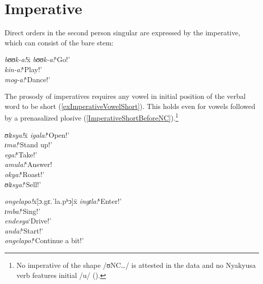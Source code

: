\section{Imperative}\label{Imperative}
Direct orders in the second person singular are expressed by the imperative, which can consist of the bare stem:
\begin{exe}
\ex
\begin{tabbing}
\textit{bʊʊk-a!}x\=\kill
\textit{bʊʊk-a!}\>`Go!'
\\\textit{kin-a!}\>`Play!'
\\\textit{mog-a!}\>`Dance!'
\end{tabbing}
\end{exe}
The prosody of imperatives requires any vowel in initial position of the verbal word to be short (\ref{exImperativeVowelShort}). This holds even for vowels followed by a prenasalized plosive (\ref{ImperativeShortBeforeNC}).\footnote{No imperative of the shape /ʊNC\ldots / is attested in the data and no Nyakyusa verb features initial /u/ ().}

\begin{exe}
\ex\label{exImperativeVowelShort}
\begin{tabbing}
\textit{ʊlɪsya!}x\=\kill
\textit{igala!}\>`Open!'
\\\textit{ɪma!}\>`Stand up!'
\\\textit{ega!}\>`Take!'
\\\textit{amula!}\>`Answer!
\\\textit{okya!}\>`Roast!'
\\\textit{ʊlɪsya!}\>`Sell!'
\end{tabbing}
\ex\label{ImperativeShortBeforeNC}
\begin{tabbing}
\textit{ongelapo!}x\=[ɔ.{\ᵑ}gɛ.ˈla.pʰɔ]x\=\kill
\textit{ingɪla!}\>[i.ˈ{\ᵑ}gɪɾ.a]\>`Enter!'
\\\textit{ɪmba!}\>[ˈɪ.ᵐba]\>`Sing!' 
\\\textit{endesya}\>`Drive!'
\\\textit{anda!}\>[ˈa.ⁿda]\>`Start!'
\\\textit{ongelapo!}\>`Continue a bit!'
\end{tabbing}
\end{exe}


